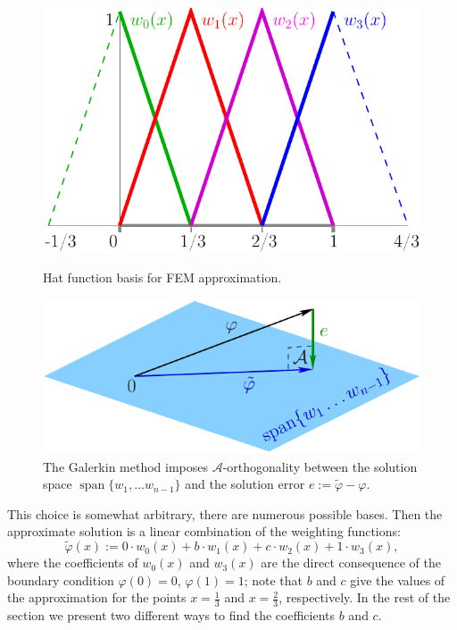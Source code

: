 \documentclass[notitlepage,oneside]{book}
\DeclareMathOperator{\Span}{span}
\begin{document}
\begin{figure}[ht]
\begin{minipage}{.45\linewidth}
	\centering
	\includegraphics[width=\linewidth]{img/blending_functions.pdf}
	\caption{Hat function basis for FEM approximation.}
	\label{fig:fem:blending}
\end{minipage}
\hspace{.05\linewidth}
\begin{minipage}{.5\linewidth}
	\centering
	\includegraphics[width=\linewidth]{img/galerkin.pdf}
	\caption{The Galerkin method imposes $\mathcal A$-orthogonality between the solution space $\Span\{w_1,\dots w_{n-1}\}$ and the solution error  $e := \tilde{\varphi} - \varphi$.}
	\label{fig:galerkin}
\end{minipage}
\end{figure}

This choice is somewhat arbitrary, there are numerous possible bases.
Then the approximate solution is a linear combination of the weighting functions:
\begin{equation}
\label{eq:tildephi}
\tilde{\varphi}(x) := 0\cdot w_0(x) + b\cdot w_1(x) + c\cdot w_2(x) + 1\cdot w_3(x),
\end{equation}
where the coefficients of $w_0(x)$ and $w_3(x)$ are the direct consequence of the boundary condition $\varphi(0)=0$, $\varphi(1)=1$;
note that $b$ and $c$ give the values of the approximation for the points $x=\frac{1}{3}$ and $x=\frac{2}{3}$, respectively.
In the rest of the section we present two different ways to find the coefficients $b$ and $c$.
\end{document}
